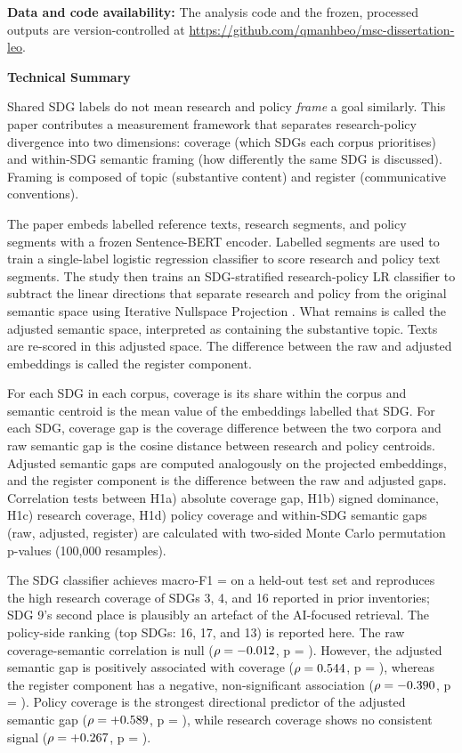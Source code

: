 \documentclass[12pt,a4paper]{article}
\renewenvironment{abstract}{%
  \par\addvspace{\baselineskip}%
  \noindent\textbf{\abstractname}\par\medskip
  \setlength{\parindent}{0pt}%
  \setlength{\leftskip}{0pt}%
  \setlength{\rightskip}{0pt}%
  \noindent\ignorespaces
}{%
  \par\addvspace{\baselineskip}%
}
\begin{document}
\par\noindent\textbf{Data and code availability:} The analysis code and the frozen, processed outputs are version-controlled at \url{https://github.com/qmanhbeo/msc-dissertation-leo}.

\renewcommand{\abstractname}{Technical Summary}
\begin{abstract}
 Shared SDG labels do not mean research and policy \emph{frame} a goal similarly. This paper contributes a measurement framework that separates research-policy divergence into two dimensions: coverage (which SDGs each corpus prioritises) and within-SDG semantic framing (how differently the same SDG is discussed). Framing is composed of topic (substantive content) and register (communicative conventions).

 The paper embeds \NReferencePool{} labelled reference texts, \NResearchSegments{} research segments, and \NPolicySegments{} policy segments with a frozen Sentence-BERT encoder. Labelled segments are used to train a single-label logistic regression classifier to score research and policy text segments. The study then trains an SDG-stratified research-policy LR classifier to subtract the linear directions that separate research and policy from the original semantic space using Iterative Nullspace Projection \parencite{Ravfogel2020INLP}. What remains is called the adjusted semantic space, interpreted as containing the substantive topic. Texts are re-scored in this adjusted space. The difference between the raw and adjusted embeddings is called the register component.

 For each SDG in each corpus, coverage is its share within the corpus and semantic centroid is the mean value of the embeddings labelled that SDG. For each SDG, coverage gap is the coverage difference between the two corpora and raw semantic gap is the cosine distance between research and policy centroids. Adjusted semantic gaps are computed analogously on the projected embeddings, and the register component is the difference between the raw and adjusted gaps. Correlation tests between H1a) absolute coverage gap, H1b) signed dominance, H1c) research coverage, H1d) policy coverage and within-SDG semantic gaps (raw, adjusted, register) are calculated with two-sided Monte Carlo permutation p-values (100,000 resamples).

 The SDG classifier achieves macro-F1 = \MacroFOne{} on a held-out test set and reproduces the high research coverage of SDGs 3, 4, and 16 reported in prior inventories; SDG 9's second place is plausibly an artefact of the AI-focused retrieval. The policy-side ranking (top SDGs: 16, 17, and 13) is reported here. The raw coverage-semantic correlation is null (\(\rho = -0.012\), p = \SpearmanCovRawP{}). However, the adjusted semantic gap is positively associated with coverage (\(\rho = 0.544\), p = \RhoCovTopicP), whereas the register component has a negative, non-significant association (\(\rho = -0.390\), p = \RhoCovRegisterP). Policy coverage is the strongest directional predictor of the adjusted semantic gap (\(\rho = +0.589\), p = \HOneDPolicyCovAdjRhoP{}), while research coverage shows no consistent signal (\(\rho = +0.267\), p = \HOneDResearchCovAdjRhoP{}).


\end{abstract}
\end{document}
